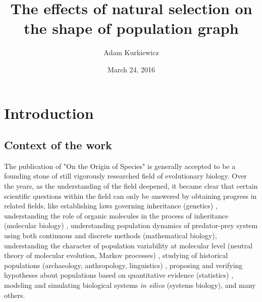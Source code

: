 \documentclass{l4proj}
\newif\ifdebug
\begin{document}
\title{The effects of natural selection on the shape of population graph}
\author{Adam Kurkiewicz}
\date{March 24, 2016}
\maketitle

\begin{abstract}
\ifdebug
  Placeholder for the abstract, which will be written at the end.
\fi

\end{abstract}

\educationalconsent
%
%
\tableofcontents
\chapter{Introduction}
\label{intro}

\ifdebug
  Introduction. This should place the work in context and will be developed from the introduction produced for assessment.
\fi


\section{Context of the work}

The publication of "On the Origin of Species" \parencite{darwin59} is generally accepted to be a founding stone of still vigorously researched field of evolutionary biology. Over the years, as the understanding of the field deepened, it became clear that certain scientific questions within the field can only be answered by obtaining progress in related fields, like establishing laws governing inheritance (genetics) \parencite{mendel}, understanding the role of organic molecules in the process of inheritance (molecular biology) \parencite{watson53}, understanding population dynamics of predator-prey system using both continuous and discrete methods (mathematical biology), understanding the character of population variability at molecular level (neutral theory of molecular evolution, Markov processes) \parencite{kimura68} \parencite{dayhoff73}, studying of historical populations (archaeology, anthropology, linguistics) \parencite{dubois}, proposing and verifying hypotheses about populations based on quantitative evidence (statistics) \parencite{bronzeAgeEurasia}, modeling and simulating biological systems \textit{in silico} (systems biology), and many others.
\end{document}
